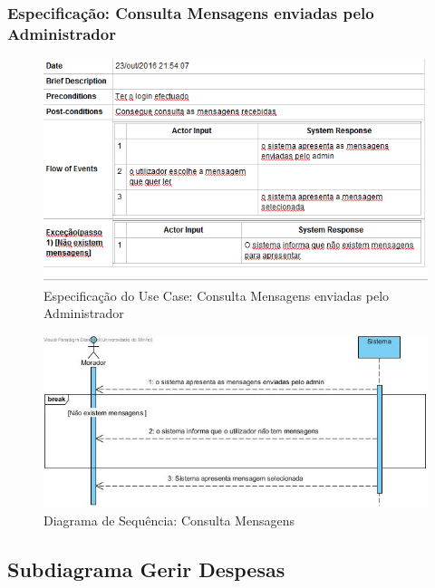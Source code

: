 \subsubsection{Especificação: Consulta Mensagens enviadas pelo Administrador }
\begin{figure}[htb!]
	\centering
	\includegraphics[scale=0.6]{imagens/Especificacoes/consultasmsadmin}  
	\caption{Especificação do Use Case: Consulta Mensagens enviadas pelo Administrador}  
\end{figure}

\begin{figure}[htb!]
	\centering
	\includegraphics[scale=0.5]{imagens/diagramaSeq/ConsultarMensagensdoAdmin}  
	\caption{Diagrama de Sequência: Consulta Mensagens}  
\end{figure}

\newpage

\subsection{Subdiagrama Gerir Despesas}

